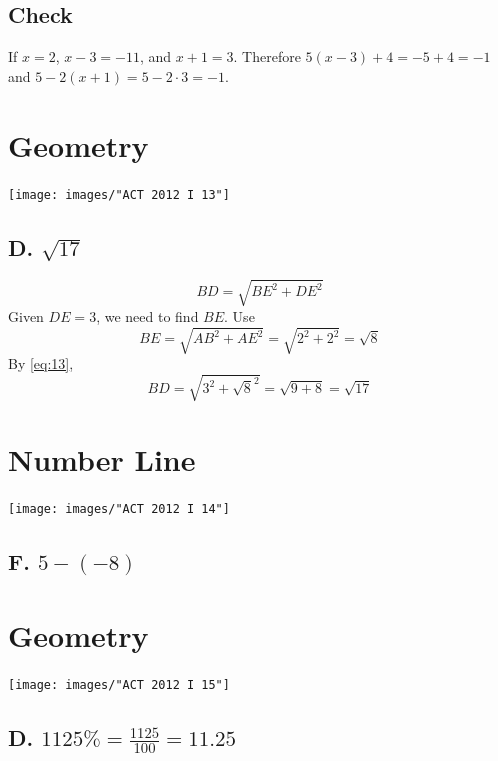 \documentclass[11pt, oneside]{article}
\begin{document}
\subsection{Check}
If $x=2$, $x-3=-11$, and $x+1=3$. Therefore $5(x-3)+4 = -5 + 4 = -1$ and $5-2(x+1) = 5-2\cdot 3 = -1$.


\section{Geometry}
\texttt{[image: images/"ACT 2012 I 13"]}
\subsection{D. $\sqrt{17}$}
%
\begin{equation}
	BD = \sqrt{BE^{2} + DE^{2}}
\label{eq:13}
\end{equation}
%
Given $DE =3$, we need to find $BE$. Use
%
\begin{equation}
	BE = \sqrt{ AB^{2} + AE^{2} } = \sqrt{ 2^{2} + 2^{2} } = \sqrt{8}
\end{equation}
%
By \eqref{eq:13}, 
%
\begin{equation}
	BD = \sqrt{3^{2} + \sqrt{8}^{2}}  = \sqrt{9 + 8} = \sqrt{17}
\end{equation}
%


\section{Number Line}
\texttt{[image: images/"ACT 2012 I 14"]}
\subsection{F. $5-(-8)$}

\section{Geometry}
\texttt{[image: images/"ACT 2012 I 15"]}
\subsection{D. $1125\% = \frac{1125}{100} = 11.25$}

\end{document}
